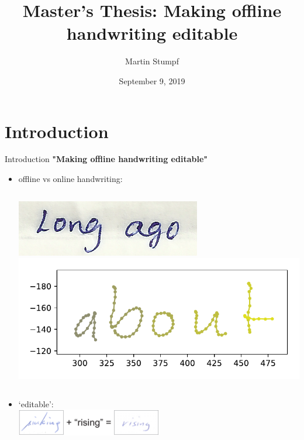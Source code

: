 \documentclass[aspectratio=169]{beamer}
\title{Master's Thesis: Making offline handwriting editable}
\institute{Pattern Recognition Lab (CS~5)}
\date{September 9, 2019}
\author{Martin Stumpf}
\begin{document}
\maketitle
  
  
  
  
\begin{frame}
  \tableofcontents
\end{frame}




\section{Introduction}

\begin{frame}{Introduction}
\textbf{"Making offline handwriting editable"}

\begin{itemize}
\item offline vs online handwriting:\\
\begin{columns}
\includegraphics[scale=2.0]{../initial_presentation/pics/12th-std1-crop.png}
\includegraphics[scale=0.4]{../initial_presentation/pics/PenPositionsImages.pdf}
\end{columns}\vspace{5pt}
\item `editable':\\
\vspace{1em}
\hspace{0.7em}\includegraphics[width=0.5\textwidth]{assets/editable_explanation.pdf}
\end{itemize}
\end{frame}
\end{document}
